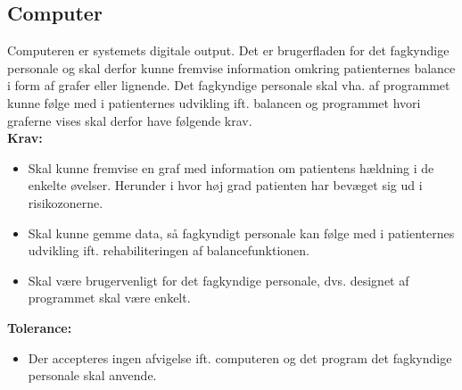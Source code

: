 \subsection{Computer}
Computeren er systemets digitale output. Det er brugerfladen for det fagkyndige personale og skal derfor kunne fremvise information omkring patienternes balance i form af grafer eller lignende. Det fagkyndige personale skal vha. af programmet kunne følge med i patienternes udvikling ift. balancen og programmet hvori graferne vises skal derfor have følgende krav. \\
\textbf{Krav:}
\begin{itemize}
\item Skal kunne fremvise en graf med information om patientens hældning i de enkelte øvelser. Herunder i hvor høj grad patienten har bevæget sig ud i risikozonerne. 
\item Skal kunne gemme data, så fagkyndigt personale kan følge med i patienternes udvikling ift. rehabiliteringen af balancefunktionen.
\item Skal være brugervenligt for det fagkyndige personale, dvs. designet af programmet skal være enkelt. 
\end{itemize}
\textbf{Tolerance:}
\begin{itemize}
\item Der accepteres ingen afvigelse ift. computeren og det program det fagkyndige personale skal anvende. 
\end{itemize}